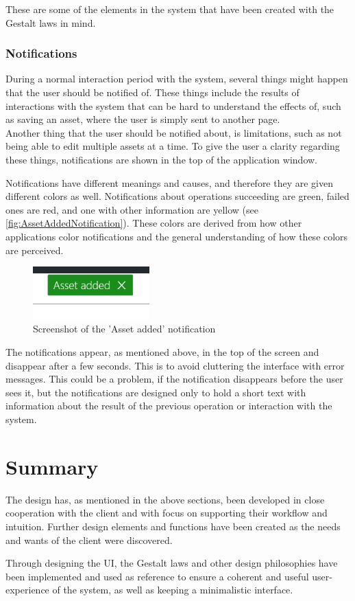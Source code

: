 These are some of the elements in the system that have been created with the Gestalt laws in mind.

\subsubsection*{Notifications}
During a normal interaction period with the system, several things might happen that the user should be notified of. These things include the results of interactions with the system that can be hard to understand the effects of, such as saving an asset, where the user is simply sent to another page. \\
Another thing that the user should be notified about, is limitations, such as not being able to edit multiple assets at a time. To give the user a clarity regarding these things, notifications are shown in the top of the application window.
\par
Notifications have different meanings and causes, and therefore they are given different colors as well. Notifications about operations succeeding are green, failed ones are red, and one with other information are yellow (see \autoref{fig:AssetAddedNotification}). These colors are derived from how other applications color notifications and the general understanding of how these colors are perceived.

\begin{figure}[H]
    \centering
    \includegraphics[width=0.4\textwidth]{figures/UIDesignElements/GreenNotification.png}
    \caption{Screenshot of the 'Asset added' notification}
    \label{fig:AssetAddedNotification}
\end{figure}

The notifications appear, as mentioned above, in the top of the screen and disappear after a few seconds. This is to avoid cluttering the interface with error messages. This could be a problem, if the notification disappears before the user sees it, but the notifications are designed only to hold a short text with information about the result of the previous operation or interaction with the system.

\section{Summary}
The design has, as mentioned in the above sections, been developed in close cooperation with the client and with focus on supporting their workflow and intuition. Further design elements and functions have been created as the needs and wants of the client were discovered.
\par
Through designing the UI, the Gestalt laws and other design philosophies have been implemented and used as reference to ensure a coherent and useful user-experience of the system, as well as keeping a minimalistic interface.
